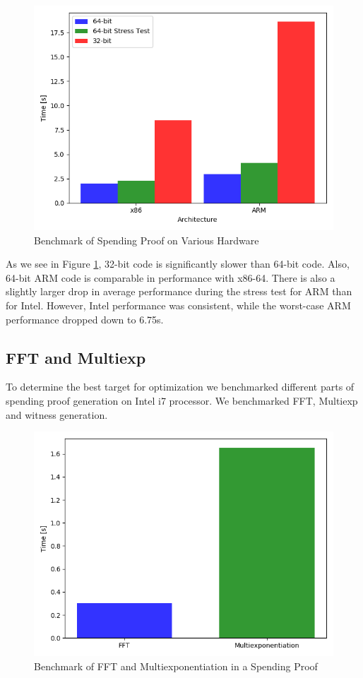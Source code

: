 \begin{figure}[h]
    \centering
    \includegraphics[width=.75\linewidth]{Figures/wholeproof.png}
    \caption{Benchmark of Spending Proof on Various Hardware}
    \label{fig:spendingproof}
\end{figure}

As we see in Figure \ref{fig:spendingproof}, 32-bit code is significantly slower than 64-bit code. Also, 64-bit ARM code is comparable in performance with x86-64. There is also a slightly larger drop in average performance during the stress test for ARM than for Intel. However, Intel performance was consistent, while the worst-case ARM performance dropped down to 6.75s.

\subsection{FFT and Multiexp}

To determine the best target for optimization we benchmarked different parts of spending proof generation on Intel i7 processor. We benchmarked FFT, Multiexp and witness generation.

\begin{figure}[h]
    \centering
    \includegraphics[width=.75\linewidth]{Figures/proofparts.png}
    \caption{Benchmark of FFT and Multiexponentiation in a Spending Proof}
    \label{fig:partsbenchmark}
\end{figure}

